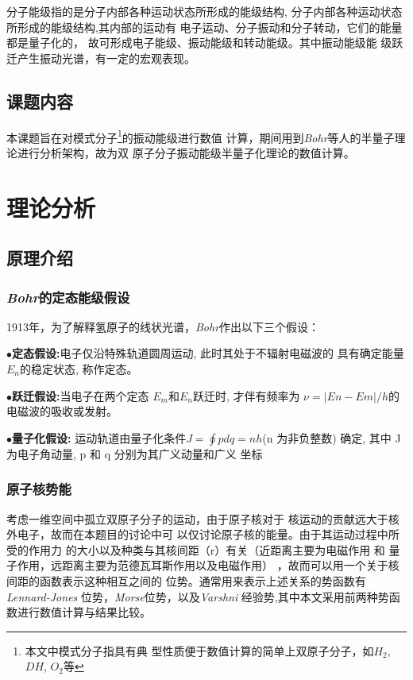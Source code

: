 \documentclass[11pt, a4paper, oneside]{ctexart}
\begin{document}
{分子能级指的是分子内部各种运动状态所形成的能级结构,
分子内部各种运动状态所形成的能级结构,其内部的运动有
电子运动、分子振动和分子转动，它们的能量都是量子化的，
故可形成电子能级、振动能级和转动能级。其中振动能级能
级跃迁产生振动光谱，有一定的宏观表现。%
\subsection{课题内容}
{本课题旨在对模式分子\footnote{本文中模式分子指具有典
型性质便于数值计算的简单上双原子分子，如$H_2$,  $ DH $,  $O_2$等}的振动能级进行数值
计算，期间用到\emph{Bohr}等人的半量子理论进行分析架构，故为双
原子分子振动能级半量子化理论的数值计算。}
\newpage
\section{理论分析}
\subsection{原理介绍}
\subsubsection{\emph{Bohr}的定态能级假设}
{1913年，为了解释氢原子的线状光谱，\emph{Bohr}作出以下三个假设：
}


\setlength{\parindent}{3em}
{
$\bullet${\bfseries{定态假设:}}{电子仅沿特殊轨道圆周运动, 此时其处于不辐射电磁波的
具有确定能量$E_n$的稳定状态, 称作定态。}


$\bullet${\bfseries{跃迁假设:}}{当电子在两个定态
$E_m$和$E_n$跃迁时, 才伴有频率为 $\nu=|E n −
E m |/h$的电磁波的吸收或发射。}


$\bullet${\bfseries{量子化假设:}}{
运动轨道由量子化条件$J =\oint pdq = 
nh $(n 为非负整数) 确定, 其中
J 为电子角动量, p 和 q 分别为其广义动量和广义
坐标}
}

\subsubsection{原子核势能}{
    考虑一维空间中孤立双原子分子的运动，由于原子核对于
    核运动的贡献远大于核外电子，故而在本题目的讨论中可
    以仅讨论原子核的能量。由于其运动过程中所受的作用力
    的大小以及种类与其核间距（r）有关（近距离主要为电磁作用
    和
    量子作用，远距离主要为范德瓦耳斯作用以及电磁作用）
    ，故而可以用一个关于核间距的函数表示这种相互之间的
    位势。通常用来表示上述关系的势函数有\emph{Lennard-Jones}
    位势，\emph{Morse}位势，以及\emph {Varshni}
    经验势,其中本文采用前两种势函数进行数值计算与结果比较。


}}
\end{document}
